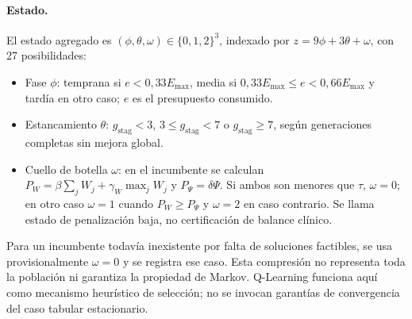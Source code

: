 \documentclass[11pt,a4paper]{article}
\newcommand{\Emax}{E_{\max}}
\newcommand{\gstag}{g_{\mathrm{stag}}}
\begin{document}
\paragraph{Estado.}
El estado agregado es $(\phi,\theta,\omega)\in\{0,1,2\}^3$, indexado por $z=9\phi+3\theta+\omega$, con 27 posibilidades:
\begin{itemize}
\item Fase $\phi$: temprana si $e<0{,}33\Emax$, media si $0{,}33\Emax\leq e<0{,}66\Emax$ y tardía en otro caso; $e$ es el presupuesto consumido.
\item Estancamiento $\theta$: $\gstag<3$, $3\leq\gstag<7$ o $\gstag\geq7$, según generaciones completas sin mejora global.
\item Cuello de botella $\omega$: en el incumbente se calculan $P_W=\beta\sum_jW_j+\gamma_W\max_jW_j$ y $P_\Psi=\delta\Psi$. Si ambos son menores que $\tau$, $\omega=0$; en otro caso $\omega=1$ cuando $P_W\geq P_\Psi$ y $\omega=2$ en caso contrario. Se llama estado de penalización baja, no certificación de balance clínico.
\end{itemize}
Para un incumbente todavía inexistente por falta de soluciones factibles, se usa provisionalmente $\omega=0$ y se registra ese caso. Esta compresión no representa toda la población ni garantiza la propiedad de Markov. Q-Learning funciona aquí como mecanismo heurístico de selección; no se invocan garantías de convergencia del caso tabular estacionario.
\end{document}
